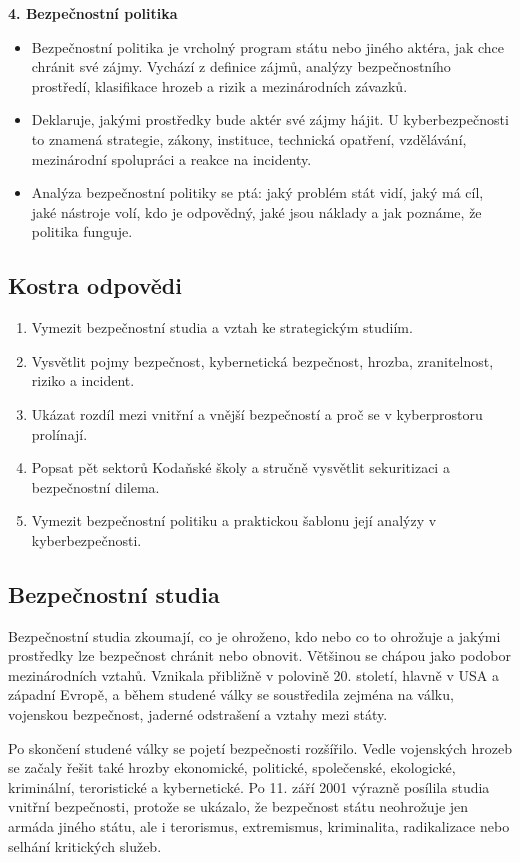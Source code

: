 \documentclass[11pt,a4paper]{article}
\begin{document}
\textbf{4. Bezpečnostní politika}
\begin{itemize}
  \item Bezpečnostní politika je vrcholný program státu nebo jiného aktéra, jak chce chránit své zájmy. Vychází z definice zájmů, analýzy bezpečnostního prostředí, klasifikace hrozeb a rizik a mezinárodních závazků.
  \item Deklaruje, jakými prostředky bude aktér své zájmy hájit. U kyberbezpečnosti to znamená strategie, zákony, instituce, technická opatření, vzdělávání, mezinárodní spolupráci a reakce na incidenty.
  \item Analýza bezpečnostní politiky se ptá: jaký problém stát vidí, jaký má cíl, jaké nástroje volí, kdo je odpovědný, jaké jsou náklady a jak poznáme, že politika funguje.
\end{itemize}

\subsection*{Kostra odpovědi}
\begin{enumerate}
  \item Vymezit bezpečnostní studia a vztah ke strategickým studiím.
  \item Vysvětlit pojmy bezpečnost, kybernetická bezpečnost, hrozba, zranitelnost, riziko a incident.
  \item Ukázat rozdíl mezi vnitřní a vnější bezpečností a proč se v kyberprostoru prolínají.
  \item Popsat pět sektorů Kodaňské školy a stručně vysvětlit sekuritizaci a bezpečnostní dilema.
  \item Vymezit bezpečnostní politiku a praktickou šablonu její analýzy v kyberbezpečnosti.
\end{enumerate}

\subsection*{Bezpečnostní studia}
Bezpečnostní studia zkoumají, co je ohroženo, kdo nebo co to ohrožuje a jakými prostředky lze bezpečnost chránit nebo obnovit. Většinou se chápou jako podobor mezinárodních vztahů. Vznikala přibližně v polovině 20. století, hlavně v USA a západní Evropě, a během studené války se soustředila zejména na válku, vojenskou bezpečnost, jaderné odstrašení a vztahy mezi státy.

Po skončení studené války se pojetí bezpečnosti rozšířilo. Vedle vojenských hrozeb se začaly řešit také hrozby ekonomické, politické, společenské, ekologické, kriminální, teroristické a kybernetické. Po 11. září 2001 výrazně posílila studia vnitřní bezpečnosti, protože se ukázalo, že bezpečnost státu neohrožuje jen armáda jiného státu, ale i terorismus, extremismus, kriminalita, radikalizace nebo selhání kritických služeb.
\end{document}
